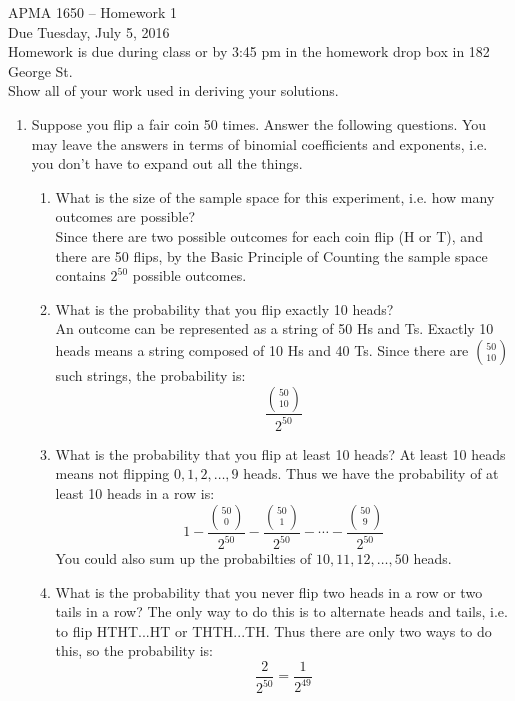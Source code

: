 \documentclass[12pt]{article}
\begin{document}
\title{}
\author{\vspace{-10ex} }

\begin{center}
{\LARGE APMA 1650 -- Homework 1}\\
\vspace{5mm}
{\large Due Tuesday, July 5, 2016}\\
\vspace{5mm}
Homework is due during class or by 3:45 pm in the homework drop box in 182 George St.\\
Show all of your work used in deriving your solutions.
\end{center}

\begin{enumerate}
\item Suppose you flip a fair coin 50 times. Answer the following questions. You may leave the answers in terms of binomial coefficients and exponents, i.e. you don't have to expand out all the things.
\begin{enumerate}
\item What is the size of the sample space for this experiment, i.e. how many outcomes are possible?\\

Since there are two possible outcomes for each coin flip (H or T), and there are 50 flips, by the Basic Principle of Counting the sample space contains $2^{50}$ possible outcomes.

\item What is the probability that you flip exactly 10 heads?\\

An outcome can be represented as a string of 50 Hs and Ts. Exactly 10 heads means a string composed of 10 Hs and 40 Ts. Since there are $\binom{50}{10}$ such strings, the probability is:
\[
\frac{\binom{50}{10}}{2^{50}}
\]

\item What is the probability that you flip at least 10 heads?
At least 10 heads means not flipping $0, 1, 2, \dots, 9$ heads. Thus we have the probability of at least 10 heads in a row is:
\[
1 - \frac{\binom{50}{0}}{2^{50}} - \frac{\binom{50}{1}}{2^{50}} - \cdots - \frac{\binom{50}{9}}{2^{50}}
\]
You could also sum up the probabilties of $10, 11, 12, \dots, 50$ heads.

\item What is the probability that you never flip two heads in a row or two tails in a row?
The only way to do this is to alternate heads and tails, i.e. to flip HTHT...HT or THTH...TH. Thus there are only two ways to do this, so the probability is:
\[
\frac{2}{2^{50}} = \frac{1}{2^{49}}
\] 
\end{enumerate}


\end{enumerate}
\end{document}

